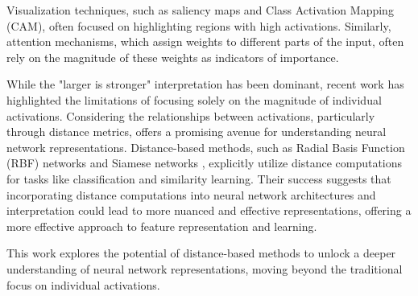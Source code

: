 Visualization techniques, such as saliency maps and Class Activation Mapping (CAM), often focused on highlighting regions with high activations. Similarly, attention mechanisms, which assign weights to different parts of the input, often rely on the magnitude of these weights as indicators of importance.

While the "larger is stronger" interpretation has been dominant, recent work has highlighted the limitations of focusing solely on the magnitude of individual activations. \citep{rudin2019stop} Considering the relationships between activations, particularly through distance metrics, offers a promising avenue for understanding neural network representations. \citep{goodfellow2014explaining,madry2017towards,szegedy2013intriguing} Distance-based methods, such as Radial Basis Function (RBF) networks \citep{broomhead1988radial} and Siamese networks \citep{bromley1994signature,schroff2015facenet}, explicitly utilize distance computations for tasks like classification and similarity learning. Their success suggests that incorporating distance computations into neural network architectures and interpretation could lead to more nuanced and effective representations, offering a more effective approach to feature representation and learning.

This work explores the potential of distance-based methods to unlock a deeper understanding of neural network representations, moving beyond the traditional focus on individual activations.